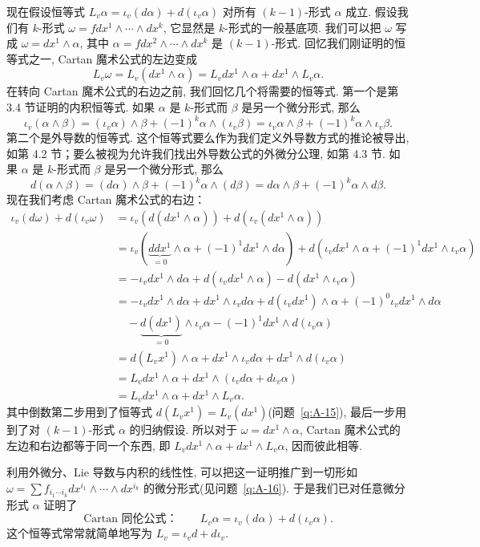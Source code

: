 现在假设恒等式 $L_v\alpha=\iota_v(d\alpha)+d(\iota_v\alpha)$ 对所有 $(k-1)$-形式 $\alpha$ 成立. 假设我们有 $k$-形式 $\omega=fdx^1\wedge\cdots\wedge dx^k$, 它显然是 $k$-形式的一般基底项. 我们可以把 $\omega$ 写成 $\omega=dx^1\wedge\alpha$, 其中 $\alpha=fdx^2\wedge\cdots\wedge dx^k$ 是 $(k-1)$-形式. 回忆我们刚证明的恒等式之一, Cartan 魔术公式的左边变成
\[
L_v\omega=L_v(dx^1\wedge\alpha)=L_vdx^1\wedge\alpha+dx^1\wedge L_v\alpha.
\]
在转向 Cartan 魔术公式的右边之前, 我们回忆几个将需要的恒等式. 第一个是第 3.4 节证明的内积恒等式. 如果 $\alpha$ 是 $k$-形式而 $\beta$ 是另一个微分形式, 那么
\[
\iota_v(\alpha\wedge\beta)=(\iota_v\alpha)\wedge\beta+(-1)^k\alpha\wedge(\iota_v\beta)
=\iota_v\alpha\wedge\beta+(-1)^k\alpha\wedge\iota_v\beta.
\]
第二个是外导数的恒等式. 这个恒等式要么作为我们定义外导数方式的推论被导出, 如第 4.2 节；要么被视为允许我们找出外导数公式的外微分公理, 如第 4.3 节. 如果 $\alpha$ 是 $k$-形式而 $\beta$ 是另一个微分形式, 那么
\[
d(\alpha\wedge\beta)=(d\alpha)\wedge\beta+(-1)^k\alpha\wedge(d\beta)
=d\alpha\wedge\beta+(-1)^k\alpha\wedge d\beta.
\]
现在我们考虑 Cartan 魔术公式的右边：
\begin{align*}
\iota_v(d\omega)+d(\iota_v\omega)&=\iota_v\left(d(dx^1\wedge\alpha)\right)+d\left(\iota_v(dx^1\wedge\alpha)\right)\\
&=\iota_v\left(\underbrace{ddx^1}_{=0}\wedge\alpha+(-1)^1dx^1\wedge d\alpha\right)+d\left(\iota_vdx^1\wedge\alpha+(-1)^1dx^1\wedge\iota_v\alpha\right)\\
&=-\iota_vdx^1\wedge d\alpha+d\left(\iota_vdx^1\wedge\alpha\right)-d\left(dx^1\wedge\iota_v\alpha\right)\\
&=-\iota_vdx^1\wedge d\alpha+dx^1\wedge\iota_vd\alpha+d\left(\iota_vdx^1\right)\wedge\alpha+(-1)^0\iota_vdx^1\wedge d\alpha\\
&\quad-\underbrace{d(dx^1)}_{=0}\wedge\iota_v\alpha-(-1)^1dx^1\wedge d(\iota_v\alpha)\\
&=d\left(L_vx^1\right)\wedge\alpha+dx^1\wedge\iota_vd\alpha+dx^1\wedge d(\iota_v\alpha)\\
&=L_vdx^1\wedge\alpha+dx^1\wedge\left(\iota_vd\alpha+d\iota_v\alpha\right)\\
&=L_vdx^1\wedge\alpha+dx^1\wedge L_v\alpha.
\end{align*}
其中倒数第二步用到了恒等式 $d(L_vx^1)=L_v(dx^1)$(问题~\ref{q:A-15}), 最后一步用到了对 $(k-1)$-形式 $\alpha$ 的归纳假设. 所以对于 $\omega=dx^1\wedge\alpha$, Cartan 魔术公式的左边和右边都等于同一个东西, 即 $L_vdx^1\wedge\alpha+dx^1\wedge L_v\alpha$, 因而彼此相等.

利用外微分、Lie 导数与内积的线性性, 可以把这一证明推广到一切形如 $\omega=\sum f_{i_1\cdots i_k}dx^{i_1}\wedge\cdots\wedge dx^{i_k}$ 的微分形式(见问题~\ref{q:A-16}). 于是我们已对任意微分形式 $\alpha$ 证明了
\[
\text{Cartan 同伦公式：}\qquad L_v\alpha=\iota_v(d\alpha)+d(\iota_v\alpha).
\]
这个恒等式常常就简单地写为 $L_v=\iota_vd+d\iota_v$.

